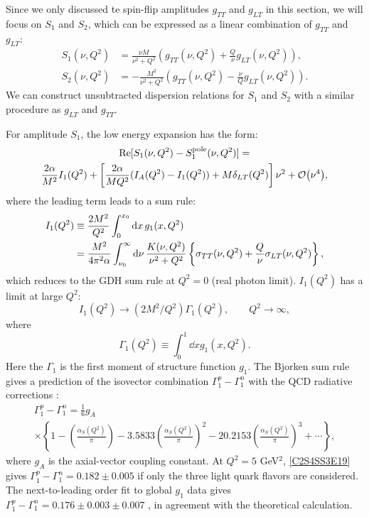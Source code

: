 Since we only discussed te spin-flip amplitudes $g_{TT}$ and $g_{LT}$ in this section, we will focus on $S_1$ and $S_2$, which can be expressed as a linear combination of $g_{TT}$ and $g_{LT}$:
\begin{equation} \label{C2S4SS3E14}
\begin{split}
S_1(\nu,Q^2) & = \frac{\nu M}{\nu^2+Q^2}\left(g_{TT}(\nu,Q^2)+\frac{Q}{\nu}g_{LT}(\nu,Q^2)\right), \\
S_2(\nu,Q^2) & = -\frac{M^2}{\nu^2+Q^2}\left(g_{TT}(\nu,Q^2)-\frac{\nu}{Q}g_{LT}(\nu,Q^2)\right).
\end{split}
\end{equation}
We can construct unsubtracted dispersion relations for $S_1$ and $S_2$ with a similar procedure as $g_{LT}$ and $g_{TT}$.

For amplitude $S_1$, the low energy expansion has the form:
\begin{multline} \label{C2S4SS3E15}
\Re[S_1(\nu,Q^2)-S_1^{\mathrm{pole}}(\nu,Q^2)] = \\
\frac{2\alpha}{M^2}I_1(Q^2)+\left[\frac{2\alpha}{MQ^2}(I_A(Q^2)-I_1(Q^2))+M\dlt(Q^2)\right]\nu^2+\order{\nu^4},
\end{multline}
where the leading term leads to a sum rule:
\begin{equation} \label{C2S4SS3E16}
\begin{split}
I_1(Q^2) & \equiv \frac{2M^2}{Q^2}\int_0^{x_0}\dd{x}g_1(x,Q^2) \\
& = \frac{M^2}{4\pi^2\alpha}\int_{\nu_0}^\infty\dd{\nu}\frac{K(\nu,Q^2)}{\nu^2+Q^2}\left\{\sigma_{TT}(\nu,Q^2)+\frac{Q}{\nu}\sigma_{LT}(\nu,Q^2)\right\},
\end{split}
\end{equation}
which reduces to the GDH sum rule at $Q^2=0$ (real photon limit). $I_1(Q^2)$ has a limit at large $Q^2$:
\begin{equation} \label{C2S4SS3E17}
I_1(Q^2)\rightarrow(2M^2/Q^2)\Gamma_1(Q^2), \qquad Q^2\rightarrow\infty,
\end{equation}
where
\begin{equation} \label{C2S4SS3E18}
\Gamma_1(Q^2) \equiv \int_0^1\dd{x}g_1(x,Q^2).
\end{equation}
Here the $\Gamma_1$ is the first moment of structure function $g_1$. The Bjorken sum rule \cite{Bjorken1966,Bjorken1970} gives a prediction of the isovector combination $\Gamma_1^p-\Gamma_1^n$ with the QCD radiative corrections \cite{Larin1991}:
\begin{multline} \label{C2S4SS3E19}
\Gamma_1^p-\Gamma_1^n = \frac{1}{6}g_A \\
\times\left\{1-\left(\frac{\alpha_S(Q^2)}{\pi}\right)-3.5833\left(\frac{\alpha_S(Q^2)}{\pi}\right)^2-20.2153\left(\frac{\alpha_S(Q^2)}{\pi}\right)^3+\cdots\right\},
\end{multline}
where $g_A$ is the axial-vector coupling constant. At $Q^2=5$ GeV${}^2$, \cref{C2S4SS3E19} gives $\Gamma_1^p-\Gamma_1^n=0.182\pm0.005$ if only the three light quark flavors are considered. The next-to-leading order fit to global $g_1$ data gives $\Gamma_1^p-\Gamma_1^n=0.176\pm0.003\pm0.007$ \cite{Anthony2000}, in agreement with the theoretical calculation.

